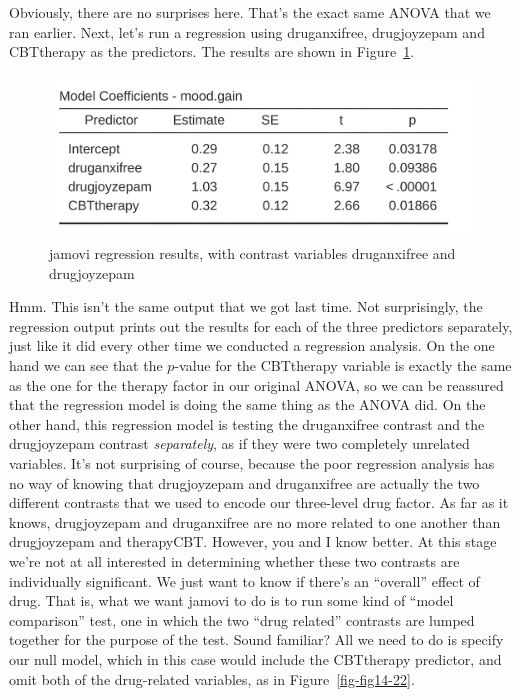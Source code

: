 \documentclass[
  a4paper,
]{book}
\begin{document}
Obviously, there are no surprises here. That's the exact same ANOVA that
we ran earlier. Next, let's run a regression using druganxifree,
drugjoyzepam and CBTtherapy as the predictors. The results are shown in
Figure~\ref{fig-fig14-21}.

\begin{figure}

\includegraphics[width=1\textwidth,height=\textheight]{images/fig14-21.png} \hfill{}

\caption{\label{fig-fig14-21}jamovi regression results, with contrast
variables druganxifree and drugjoyzepam}

\end{figure}

Hmm. This isn't the same output that we got last time. Not surprisingly,
the regression output prints out the results for each of the three
predictors separately, just like it did every other time we conducted a
regression analysis. On the one hand we can see that the \(p\)-value for
the CBTtherapy variable is exactly the same as the one for the therapy
factor in our original ANOVA, so we can be reassured that the regression
model is doing the same thing as the ANOVA did. On the other hand, this
regression model is testing the druganxifree contrast and the
drugjoyzepam contrast \emph{separately}, as if they were two completely
unrelated variables. It's not surprising of course, because the poor
regression analysis has no way of knowing that drugjoyzepam and
druganxifree are actually the two different contrasts that we used to
encode our three-level drug factor. As far as it knows, drugjoyzepam and
druganxifree are no more related to one another than drugjoyzepam and
therapyCBT. However, you and I know better. At this stage we're not at
all interested in determining whether these two contrasts are
individually significant. We just want to know if there's an ``overall''
effect of drug. That is, what we want jamovi to do is to run some kind
of ``model comparison'' test, one in which the two ``drug related''
contrasts are lumped together for the purpose of the test. Sound
familiar? All we need to do is specify our null model, which in this
case would include the CBTtherapy predictor, and omit both of the
drug-related variables, as in Figure~\ref{fig-fig14-22}.
\end{document}
